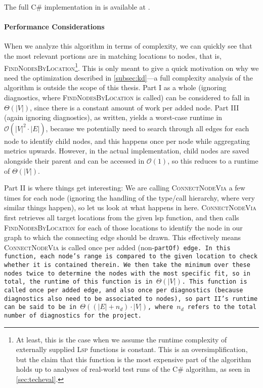\documentclass[../thesis]{subfiles}
\begin{document}
The full C\# implementation in \SEE{} is available at .

\paragraph{Performance Considerations}\label{subsec:performance}
When we analyze this algorithm in terms of complexity, we can quickly see that the most relevant portions are in matching locations to nodes, that is, \textsc{FindNodesByLocation}\footnote{
	At least, this is the case when we assume the runtime complexity of externally supplied \textsc{Lsp} functions is constant.
	This is an oversimplification, but the claim that this function is the most expensive part of the algorithm holds up to analyses of real-world test runs of the C\# algorithm, as seen in \cref{sec:techeval}.
}.
This is only meant to give a quick motivation on why we need the optimization described in \cref{subsec:kd}---a full complexity analysis of the algorithm is outside the scope of this thesis.
Part I as a whole (ignoring diagnostics, where \textsc{FindNodesByLocation} is called) can be considered to fall in $\Theta(|V|)$, since there is a constant amount of work per added node.
Part III (again ignoring diagnostics), as written, yields a worst-case runtime in $\mathcal{O}(|V|^2 \cdot |E|)$, because we potentially need to search through all edges for each node to identify child nodes, and this happens once per node while aggregating metrics upwards.
However, in the actual implementation, child nodes are saved alongside their parent and can be accessed in $\mathcal{O}(1)$, so this reduces to a runtime of $\Theta(|V|)$.

Part II is where things get interesting:
We are calling \textsc{ConnectNodeVia} a few times for each node (ignoring the handling of the type/call hierarchy, where very similar things happen), so let us look at what happens in here.
\textsc{ConnectNodeVia} first retrieves all target locations from the given \gls{lsp} function, and then calls \textsc{FindNodesByLocation} for each of those locations to identify the node in our graph to which the connecting edge should be drawn.
This effectively means \textsc{ConnectNodeVia} is called once per added (non-\tt{partOf}) edge.
In this function, each node's range is compared to the given location to check whether it is contained therein.
We then take the minimum over these nodes twice to determine the nodes with the most specific fit, so in total, the runtime of this function is in $\Theta(|V|)$.
This function is called once per added edge, and also once per diagnostics (because diagnostics also need to be associated to nodes), so part II's runtime can be said to be in $\Theta((|E| + n_d) \cdot |V|)$, where $n_d$ refers to the total number of diagnostics for the project.
\end{document}
